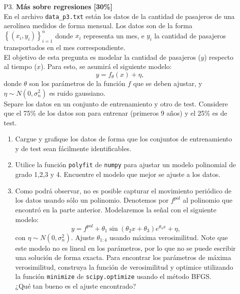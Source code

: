 \documentclass[letterpaper,11pt]{article}
\theoremstyle{plain}
\theoremstyle{definition}
\newcommand{\1}{\mathbbm{1}}
\begin{document}
\begin{enumerate}
\begin{enumerate}
\end{enumerate}


\item [P3.] \textbf{Más sobre regresiones [30\%]}\\

En el archivo \texttt{data\_p3.txt} están los datos de la cantidad de pasajeros de una aerolínea medidos de forma mensual. Los datos son de la forma $\left \{(x_i,y_i)\right \}_{i=1}^{n}$ donde $x_i$ representa un mes, e $y_i$ la cantidad de pasajeros transportados en el mes correspondiente.\\

El objetivo de esta pregunta es modelar la cantidad de pasajeros ($y$) respecto al tiempo ($x$). Para esto, se asumirá el siguiente modelo: 
$$
y = f_{\theta}(x) + \eta,
$$
donde $\theta$ son los parámetros de la función $f$ que se deben ajustar, y $\eta \sim N(0, \sigma_n^2) $ es ruido gaussiano. \\

Separe los datos en un conjunto de entrenamiento y otro de test. Considere que el 75\% de los datos son para entrenar (primeros 9 años) y el 25\% es de test. 
\begin{enumerate}
    \item  Cargue y grafique los datos de forma que  los conjuntos de entrenamiento y de test sean fácilmente identificables.
    \item Utilice la función \texttt{polyfit} de \texttt{numpy} para ajustar un modelo polinomial de grado 1,2,3 y 4. Encuentre el modelo que mejor se ajuste a los datos.
    
    
    
    \item Como podrá observar, no es posible capturar el movimiento periódico de los datos usando sólo un polinomio. Denotemos por $f^{pol}$ al polinomio que encontró en la parte anterior. Modelaremos la señal con el siguiente modelo: 
    $$
    y = f^{pol} + \theta_1    \sin (\theta_2 x + \theta_3)e^{\theta_4 x } + \eta,
    $$
    con $\eta \sim N(0, \sigma_n^2) $. Ajuste $\theta_{1:4}$ usando máxima verosimilitud. Note que este modelo no es lineal en los parámetros, por lo que no se puede escribir una solución de forma exacta. Para encontrar los parámetros de máxima verosimilitud, construya la función de verosimilitud y optimice utilizando la función \texttt{minimize} de \texttt{scipy.optimize} usando el método BFGS. \\
    ¿Qué tan bueno es el ajuste encontrado?\\
    

\end{enumerate}
\end{enumerate}
\end{document}
